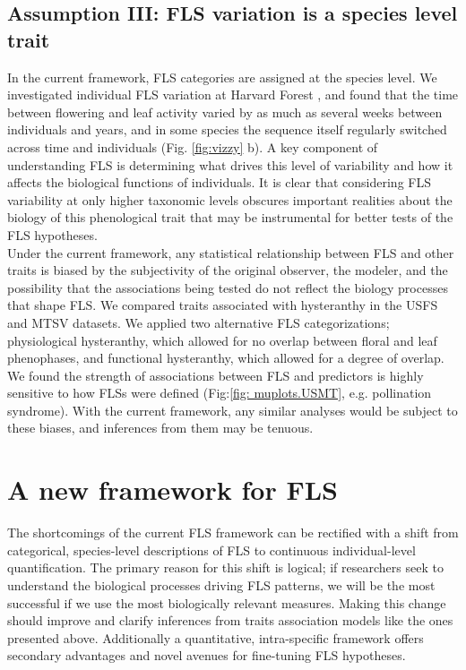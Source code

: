 \documentclass{article}
\begin{document}
{\subsection*{Assumption III: FLS variation is a species level trait}
In the current framework, FLS categories are assigned at the species level. We investigated individual FLS variation at Harvard Forest \citep{OKeefe2015}, and found that the time between flowering and leaf activity varied by as much as several weeks between individuals and years, and in some species the sequence itself regularly switched across time and individuals  (Fig. \ref{fig:vizzy} b). A key component of understanding FLS is determining what drives this level of variability and how it affects the biological functions of individuals. It is clear that considering FLS variability at only higher taxonomic levels obscures important realities about the biology of this phenological trait that may be instrumental for better tests of the FLS hypotheses.\\

\noindent Under the current framework, any statistical relationship between FLS and other traits is biased by the subjectivity of the original observer, the modeler, and the possibility that the associations being tested do not reflect the biology processes that shape FLS. We compared traits associated with hysteranthy in the USFS and MTSV datasets. We applied two alternative FLS categorizations; physiological hysteranthy, which allowed for no overlap between floral and leaf phenophases, and functional hysteranthy, which allowed for a degree of overlap. We found the strength of associations between FLS and predictors is highly sensitive to how FLSs were defined (Fig:\ref{fig: muplots.USMT}, e.g. pollination syndrome). With the current framework, any similar analyses would be subject to these biases, and inferences from them may be tenuous. \\

\section*{A new framework for FLS}
The shortcomings of the current FLS framework can be rectified with a shift from categorical, species-level descriptions of FLS to continuous individual-level quantification. The primary reason for this shift is logical; if researchers seek to understand the biological processes driving FLS patterns, we will be the most successful if we use the most biologically relevant measures. Making this change should improve and clarify inferences from traits association models like the ones presented above. Additionally a quantitative, intra-specific framework offers secondary advantages and novel avenues for fine-tuning FLS hypotheses.\\

}
\end{document}
